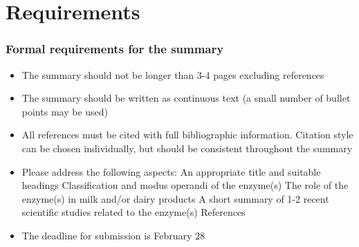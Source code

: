 \chapter{Requirements}
\setlength{\headheight}{12.71342pt}
\addtolength{\topmargin}{-0.71342pt}

\subsection*{Formal requirements for the summary}

\begin{itemize}
    \item The summary should not be longer than 3-4 pages excluding references
    \item The summary should be written as continuous text (a small number of bullet points may be used)
    \item All references must be cited with full bibliographic information. Citation style can be chosen individually, but should be consistent throughout the summary
    \item Please address the following aspects:
    \subitem An appropriate title and suitable headings
    \subitem Classification and modus operandi of the enzyme(s)
    \subitem The role of the enzyme(s) in milk and/or dairy products
    \subitem A short summary of 1-2 recent scientific studies related to the enzyme(s)
    \subitem References
    \item The deadline for submission is February 28
\end{itemize}


 
